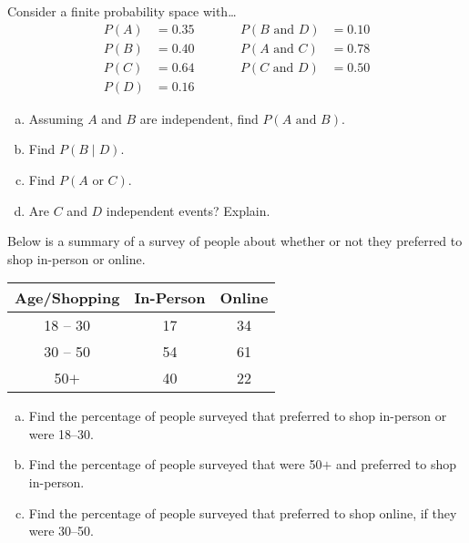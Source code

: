 \documentclass[12pt,letterpaper]{exam}
\begin{document}
\examtitle
{} 
\scores
\bottomline
\newpage

\begin{questions}

\newpage
\question[10] Consider a finite probability space with\dots
	\[
	\begin{aligned}
	P(A)&= 0.35 &\qquad & P(B \text{ and } D)&= 0.10 \\
	P(B)&= 0.40 & 		  & P(A \text{ and } C)&= 0.78 \\
	P(C)&= 0.64 & 		  & P(C \text{ and } D)&= 0.50 \\
	P(D)&= 0.16
	\end{aligned}
	\]

\begin{enumerate}[(a)]
\item Assuming $A$ and $B$ are independent, find $P(A \text{ and } B)$. 
\item Find $P(B \;|\; D)$.
\item Find $P(A \text{ or } C)$.
\item Are $C$ and $D$ independent events? Explain. 
\end{enumerate}



\newpage
\question[10] Below is a summary of a survey of people about whether or not they preferred to shop in-person or online. \par
	\begin{table}[h]
	\centering
	\begin{tabular}{c|cc}
	Age/Shopping & In-Person & Online \\ \hline
	18 -- 30 & 17 & 34 \\
	30 -- 50 & 54 & 61 \\
	50$+$ & 40 & 22
	\end{tabular}
	\end{table} \par

\begin{enumerate}[(a)]
\item Find the percentage of people surveyed that preferred to shop in-person or were 18--30. 
\item Find the percentage of people surveyed that were 50$+$ and preferred to shop in-person. 
\item Find the percentage of people surveyed that preferred to shop online, if they were 30--50. 
\end{enumerate}




\end{questions}
\end{document}
